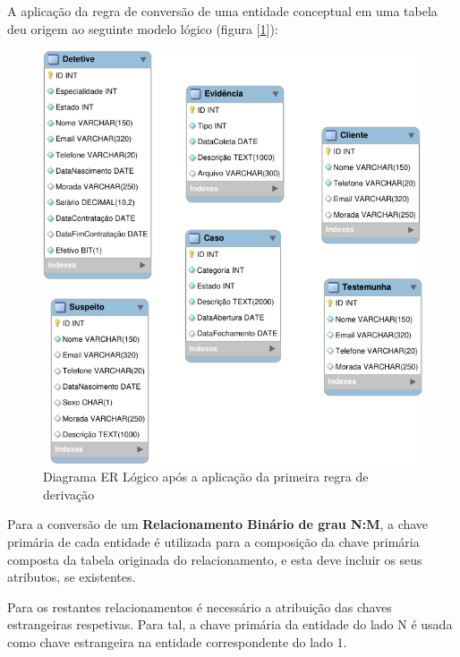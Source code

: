 \documentclass[a4paper,12pt]{scrreprt}
\begin{document}
        \vspace{0.2cm}

        A aplicação da regra de conversão de uma entidade conceptual em uma tabela deu origem ao seguinte modelo lógico (figura [\ref{fig:4.1}]):

        \vspace{0.1cm}

        \begin{figure}[!ht]
            \centering
            \includegraphics[scale=0.995]{images/modelo_logico/regra1.pdf}
            \caption{Diagrama ER Lógico após a aplicação da primeira regra de derivação}
            \label{fig:4.1}
        \end{figure}

        \clearpage
        
        Para a conversão de um \textbf{Relacionamento Binário de grau N:M}, a chave primária de cada entidade é utilizada para a composição da chave primária composta da tabela originada do relacionamento, e esta deve incluir os seus atributos, se existentes.

        Para os restantes relacionamentos é necessário a atribuição das chaves estrangeiras respetivas. Para tal, a chave primária da entidade do lado N é usada como chave estrangeira na entidade correspondente do lado 1.
\end{document}
